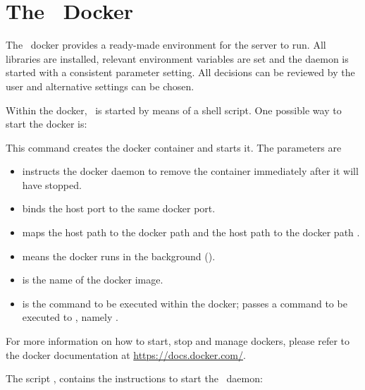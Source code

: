 \section{The \nowdb\ Docker}
The \nowdb\ docker provides a ready-made environment
for the server to run. All libraries are installed,
relevant environment variables are set and the daemon
is started with a consistent parameter setting.
All decisions can be reviewed by the user and alternative
settings can be chosen.

Within the docker, \nowdb\ is started
by means of a shell script.
One possible way to start the docker is:


This command creates the docker container and starts it.
The parameters are
\begin{itemize}
\item {}
instructs the docker daemon to remove
the container immediately after it will have stopped.

\item {} binds the host port 
to the same docker port.

\item {} maps the host path
 to the docker path  and
the host path  to the docker path .

\item {} means the docker runs in the background
().

\item {} is the name of the docker image.

\item {} is the command to be executed
within the docker;  passes a command
to be executed to ,
namely .
\end{itemize}

For more information on how to start, stop and manage
dockers, please refer to the docker documentation at
\url{https://docs.docker.com/}.

The script , contains the
instructions to start the \nowdb\ daemon:

